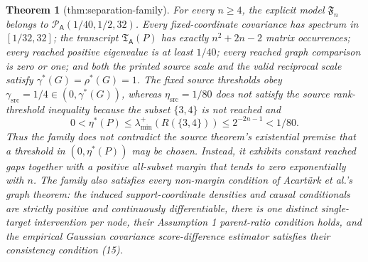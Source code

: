 \documentclass{article}
\newtheorem{theorem}{Theorem}
\begin{document}
\begin{theorem}[thm:separation-family]\label{thm:separation-family}
For every \(n\ge4\), the explicit model \(\mathfrak F_n\) belongs to \(\mathcal P_{\mathsf A}(1/40,1/2,32)\). Every fixed-coordinate covariance has spectrum in \([1/32,32]\); the transcript \(\mathfrak T_{\mathsf A}(P)\) has exactly \(n^2+2n-2\) matrix occurrences; every reached positive eigenvalue is at least \(1/40\); every reached graph comparison is zero or one; and both the printed source scale and the valid reciprocal scale satisfy \(\gamma^{\ast}(G)=\rho^{\ast}(G)=1\). The fixed source thresholds obey \(\gamma_{\mathrm{src}}=1/4\in(0,\gamma^{\ast}(G))\), whereas \(\eta_{\mathrm{src}}=1/80\) does not satisfy the source rank-threshold inequality because the subset \(\{3,4\}\) is not reached and
\[
0<\eta^{\ast}(P)\le\lambda_{\min}^{+}(R(\{3,4\}))\le2^{-2n-1}<1/80.
\]
Thus the family does not contradict the source theorem's existential premise that a threshold in \((0,\eta^{\ast}(P))\) may be chosen. Instead, it exhibits constant reached gaps together with a positive all-subset margin that tends to zero exponentially with \(n\). The family also satisfies every non-margin condition of Acartürk et al.'s graph theorem: the induced support-coordinate densities and causal conditionals are strictly positive and continuously differentiable, there is one distinct single-target intervention per node, their Assumption 1 parent-ratio condition holds, and the empirical Gaussian covariance score-difference estimator satisfies their consistency condition (15).
\end{theorem}
\end{document}
